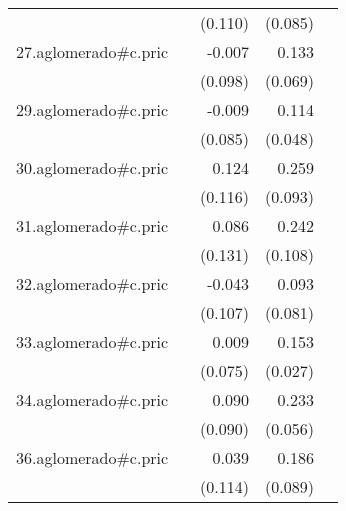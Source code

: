 {\begin{longtable}{l*{4}{D{.}{.}{-1}}}
            &                     &     (0.110)         &     (0.085)         &                     \\
\addlinespace
27.aglomerado#c.pric&                     &      -0.007         &       0.133         &                     \\
            &                     &     (0.098)         &     (0.069)         &                     \\
\addlinespace
29.aglomerado#c.pric&                     &      -0.009         &       0.114\sym{*}  &                     \\
            &                     &     (0.085)         &     (0.048)         &                     \\
\addlinespace
30.aglomerado#c.pric&                     &       0.124         &       0.259\sym{**} &                     \\
            &                     &     (0.116)         &     (0.093)         &                     \\
\addlinespace
31.aglomerado#c.pric&                     &       0.086         &       0.242\sym{*}  &                     \\
            &                     &     (0.131)         &     (0.108)         &                     \\
\addlinespace
32.aglomerado#c.pric&                     &      -0.043         &       0.093         &                     \\
            &                     &     (0.107)         &     (0.081)         &                     \\
\addlinespace
33.aglomerado#c.pric&                     &       0.009         &       0.153\sym{***}&                     \\
            &                     &     (0.075)         &     (0.027)         &                     \\
\addlinespace
34.aglomerado#c.pric&                     &       0.090         &       0.233\sym{***}&                     \\
            &                     &     (0.090)         &     (0.056)         &                     \\
\addlinespace
36.aglomerado#c.pric&                     &       0.039         &       0.186\sym{*}  &                     \\
            &                     &     (0.114)         &     (0.089)         &                     \\

\end{longtable}}

